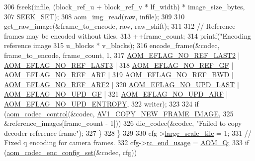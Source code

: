 \begin{DoxyCodeInclude}
{{{{{{306       fseek(infile, (block\_ref\_u + block\_ref\_v * lf\_width) * image\_size\_bytes,
307             SEEK\_SET);
308       aom\_img\_read(raw, infile);
309 
310       get\_raw\_image(&frame\_to\_encode, raw, raw\_shift);
311 
312       \textcolor{comment}{// Reference frames may be encoded without tiles.}
313       ++frame\_count;
314       printf(\textcolor{stringliteral}{"Encoding reference image %
315              u\_blocks * v\_blocks);
316       encode\_frame(&codec, frame\_to\_encode, frame\_count, 1,
317                    \hyperlink{group__aom__encoder_ga50c2560ca6670298cfc614ecae96a391}{AOM\_EFLAG\_NO\_REF\_LAST2} | 
      \hyperlink{group__aom__encoder_gaa4bc8ae2b977b73f0ef57ba428ca1d2c}{AOM\_EFLAG\_NO\_REF\_LAST3} |
318                        \hyperlink{group__aom__encoder_gaaef6fe76991abf87edd2f296eee999f8}{AOM\_EFLAG\_NO\_REF\_GF} | 
      \hyperlink{group__aom__encoder_ga9e2f989737d63ddf4e987a525d186a46}{AOM\_EFLAG\_NO\_REF\_ARF} |
319                        \hyperlink{group__aom__encoder_ga758649aa6cd9fefb15ad888489884a38}{AOM\_EFLAG\_NO\_REF\_BWD} | 
      \hyperlink{group__aom__encoder_gad04799a74215e1b9609f7ccd1766f8c9}{AOM\_EFLAG\_NO\_REF\_ARF2} |
320                        \hyperlink{group__aom__encoder_ga7a55a46970c074b761319c5c46d87b6e}{AOM\_EFLAG\_NO\_UPD\_LAST} | 
      \hyperlink{group__aom__encoder_gaa81cc31f95fd463f51a158050d267a36}{AOM\_EFLAG\_NO\_UPD\_GF} |
321                        \hyperlink{group__aom__encoder_ga469b4cf5ff76cb30de951e129c25a786}{AOM\_EFLAG\_NO\_UPD\_ARF} | 
      \hyperlink{group__aom__encoder_gac5a69f04b0bc88f755587a1da815d754}{AOM\_EFLAG\_NO\_UPD\_ENTROPY},
322                    writer);
323 
324       \textcolor{keywordflow}{if} (\hyperlink{group__codec_ga6da974f4eeaba1fa74106b28d0fe6ac5}{aom\_codec\_control}(&codec, \hyperlink{group__aom_gga9421a1fa78c0d9587ae5aa6c1cb3d659ae41763622ee33cd99e23ca8f78a3f8fa}{AV1\_COPY\_NEW\_FRAME\_IMAGE},
325                             &reference\_images[frame\_count - 1]))
326         die\_codec(&codec, \textcolor{stringliteral}{"Failed to copy decoder reference frame"});
327     \}
328   \}
329 
330   cfg->\hyperlink{structaom__codec__enc__cfg_af4583da6c145778f822a4a61db28c40a}{large\_scale\_tile} = 1;
331   \textcolor{comment}{// Fixed q encoding for camera frames.}
332   cfg->\hyperlink{structaom__codec__enc__cfg_a3fd74d888658039d09bc4eacf163a495}{rc\_end\_usage} = \hyperlink{group__encoder_gga7c084d3ecef569aad166ce70b0e8a957aff3bbd4fe870b4b946c2093e59eb14e5}{AOM\_Q};
333   \textcolor{keywordflow}{if} (\hyperlink{group__encoder_gaf4a4c3c3c91dd92c960990f6e534271d}{aom\_codec\_enc\_config\_set}(&codec, cfg))
}}}}}}}
\end{DoxyCodeInclude}
